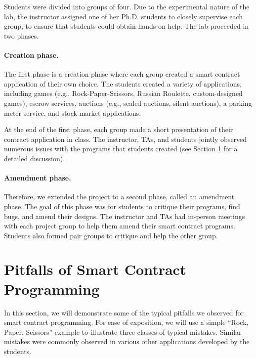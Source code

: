 \documentclass[10pt,twocolumn,letterpaper]{article}
\begin{document}
Students were divided into groups of four.  
Due to the experimental nature of the lab, 
the instructor assigned one of her Ph.D. students 
to closely supervise each group, to ensure that students
could obtain hands-on help.
The lab proceeded in two phases. 

\paragraph{Creation phase.}
The first phase is a 
{creation} phase where each group created a 
smart contract application
of their own choice.
The students created a variety of applications, including
games (e.g., Rock-Paper-Scissors, Russian Roulette, custom-designed games),
escrow services, 
auctions (e.g., sealed auctions, silent auctions),
a parking meter 
service, and stock market applications.

At the end of the first phase, each group 
made a short presentation of their 
contract application in class.
The instructor, TAs, and students jointly observed numerous issues  
with the programs that students 
created (see Section \ref{sec:pitfalls} for a detailed
discussion). 

\paragraph{Amendment phase.}
Therefore, we extended the project to a second phase, called 
an {amendment} phase. 
The goal of this phase was for students to critique their programs,
find bugs, and amend their designs. 
The instructor and TAs had in-person meetings with each project group
to help them amend their smart contract programs.  
Students also formed pair groups to critique and 
help the other group. 



\section{Pitfalls of Smart Contract Programming}
\label{sec:pitfalls}
In this section, we will demonstrate some of the typical pitfalls
we observed for smart contract programming. 
For ease of exposition, we will use
a simple ``Rock, Paper, Scissors''  
example to illustrate three classes of typical mistakes.
Similar mistakes 
were commonly observed in various other 
applications developed by the students.  
\end{document}

